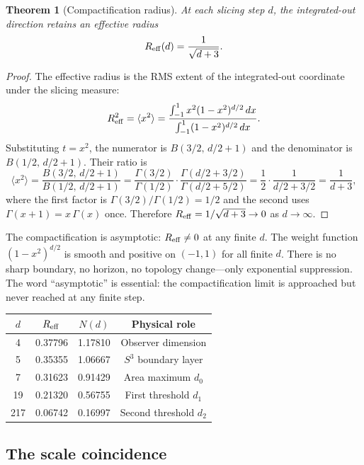 \documentclass[12pt,a4paper]{article}
\newtheorem{theorem}{Theorem}[section]
\begin{document}
\begin{theorem}[Compactification radius]\label{thm:reff}
At each slicing step $d$, the integrated-out direction retains an effective radius
\[
R_{\rm eff}(d) = \frac{1}{\sqrt{d+3}}.
\]
\end{theorem}
\begin{proof}
The effective radius is the RMS extent of the integrated-out coordinate under the
slicing measure:
\[
R_{\rm eff}^2 = \langle x^2\rangle
= \frac{\int_{-1}^{1} x^2(1-x^2)^{d/2}\,dx}{\int_{-1}^{1}(1-x^2)^{d/2}\,dx}.
\]
Substituting $t = x^2$, the numerator is $B(3/2,\,d/2+1)$ and the denominator is
$B(1/2,\,d/2+1)$. Their ratio is
\[
\langle x^2\rangle = \frac{B(3/2,\,d/2+1)}{B(1/2,\,d/2+1)}
= \frac{\Gamma(3/2)}{\Gamma(1/2)}\cdot\frac{\Gamma(d/2+3/2)}{\Gamma(d/2+5/2)}
= \frac{1}{2}\cdot\frac{1}{d/2+3/2}
= \frac{1}{d+3},
\]
where the first factor is $\Gamma(3/2)/\Gamma(1/2) = 1/2$ and the second uses
$\Gamma(x+1) = x\,\Gamma(x)$ once.
Therefore $R_{\rm eff} = 1/\sqrt{d+3} \to 0$ as $d\to\infty$.
\end{proof}

The compactification is asymptotic: $R_{\rm eff}\neq 0$ at any finite $d$. The weight
function $(1-x^2)^{d/2}$ is smooth and positive on $(-1,1)$ for all finite $d$. There is
no sharp boundary, no horizon, no topology change---only exponential suppression. The word
``asymptotic'' is essential: the compactification limit is approached but never reached at
any finite step.

\begin{center}
\begin{tabular}{cccc}
\toprule
$d$ & $R_{\rm eff}$ & $N(d)$ & Physical role \\
\midrule
4   & 0.37796 & 1.17810 & Observer dimension \\
5   & 0.35355 & 1.06667 & $S^3$ boundary layer \\
7   & 0.31623 & 0.91429 & Area maximum $d_0$ \\
19  & 0.21320 & 0.56755 & First threshold $d_1$ \\
217 & 0.06742 & 0.16997 & Second threshold $d_2$ \\
\bottomrule
\end{tabular}
\end{center}

\subsection{The scale coincidence}
\end{document}
